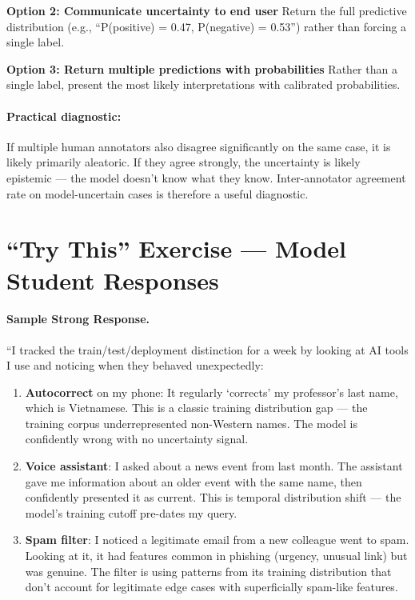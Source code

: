 \textbf{Option 2: Communicate uncertainty to end user}
Return the full predictive distribution (e.g., ``P(positive) = 0.47, P(negative) = 0.53'') rather than forcing a single label.

\textbf{Option 3: Return multiple predictions with probabilities}
Rather than a single label, present the most likely interpretations with calibrated probabilities.

\paragraph{Practical diagnostic:} If multiple human annotators also disagree significantly on the same case, it is likely primarily aleatoric. If they agree strongly, the uncertainty is likely epistemic --- the model doesn't know what they know. Inter-annotator agreement rate on model-uncertain cases is therefore a useful diagnostic.

\section{``Try This'' Exercise --- Model Student Responses}

\paragraph{Sample Strong Response.}

``I tracked the train/test/deployment distinction for a week by looking at AI tools I use and noticing when they behaved unexpectedly:

\begin{enumerate}
    \item \textbf{Autocorrect} on my phone: It regularly `corrects' my professor's last name, which is Vietnamese. This is a classic training distribution gap --- the training corpus underrepresented non-Western names. The model is confidently wrong with no uncertainty signal.

    \item \textbf{Voice assistant}: I asked about a news event from last month. The assistant gave me information about an older event with the same name, then confidently presented it as current. This is temporal distribution shift --- the model's training cutoff pre-dates my query.

    \item \textbf{Spam filter}: I noticed a legitimate email from a new colleague went to spam. Looking at it, it had features common in phishing (urgency, unusual link) but was genuine. The filter is using patterns from its training distribution that don't account for legitimate edge cases with superficially spam-like features.
\end{enumerate}

